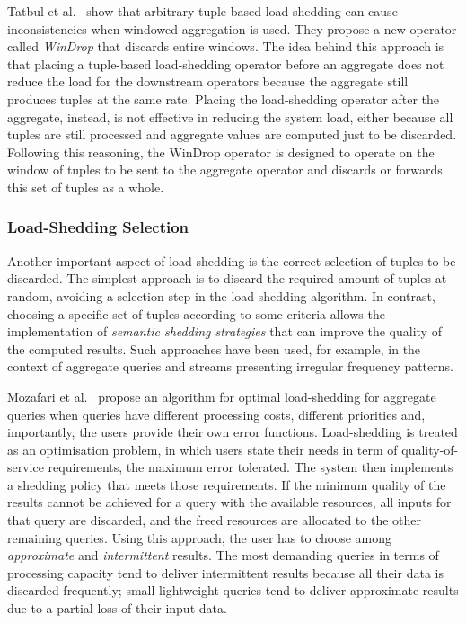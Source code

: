 Tatbul et al.~\cite{loadshed-tatbul2} show that arbitrary tuple-based load-shedding can cause
inconsistencies when windowed aggregation is used. They propose a new operator called \emph{WinDrop}
that discards entire windows. The idea behind this approach is that
placing a tuple-based \mbox{load-shedding} operator before an aggregate does not reduce the load for the
downstream operators because the aggregate still produces tuples at the same rate. Placing the \mbox{load-shedding}
operator after the aggregate, instead, is not effective in reducing the system load, either because all
tuples are still processed and aggregate values are computed just to be discarded. Following this
reasoning, the WinDrop operator is designed to operate on the window of tuples to be sent to the
aggregate operator and discards or forwards this set of tuples as a whole.
\subsubsection*{\mbox{Load-Shedding} Selection}
Another important aspect of load-shedding is the correct selection of tuples to be discarded. The
simplest approach is to discard the required amount of tuples at random, avoiding a selection step in
the load-shedding algorithm. In contrast, choosing a specific set of tuples according to some
criteria allows the implementation of \emph{semantic shedding strategies} that can improve the quality of
the computed results. Such approaches have been used, for example, in the context of aggregate
queries and streams presenting irregular frequency patterns.
	
Mozafari et al.~\cite{loadshed-mozafari} propose an algorithm for optimal \mbox{load-shedding} for
aggregate queries when queries have different processing costs, different priorities and, importantly,
the users provide their own error functions. \mbox{Load-shedding} is treated as an optimisation problem,
in which users state their needs in term of quality-of-service requirements, \eg the maximum error
tolerated. The system then implements a shedding policy that meets those requirements. If the minimum
quality of the results cannot be achieved for a query with the available resources, all inputs for that
query are discarded, and the freed resources are allocated to the other remaining queries. Using this
approach, the user has to choose among \emph{approximate} and \emph{intermittent} results. The most
demanding queries in terms of processing capacity tend to deliver intermittent results because all their
data is discarded frequently; small lightweight queries tend to deliver approximate results due to
a partial loss of their input data.

